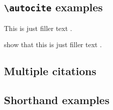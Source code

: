 \documentclass[a4paper]{article}
\newcommand{\cmd}[1]{\texttt{\textbackslash #1}}
\begin{document}
\subsection*{\cmd{autocite} examples}


This is just filler text \autocite{companion}.

\citeauthor{companion} show that this is just filler
text \autocite*{companion}.

\subsection*{Multiple citations}


\cite{knuth:ct:c,aristotle:physics,knuth:ct:b,aristotle:poetics,aristotle:rhetoric,knuth:ct:d}

\subsection*{Shorthand examples}


\cite{kant:kpv,kant:ku}

\clearpage


\printshorthands


\nocite{*}
\printbibliography
\end{document}
